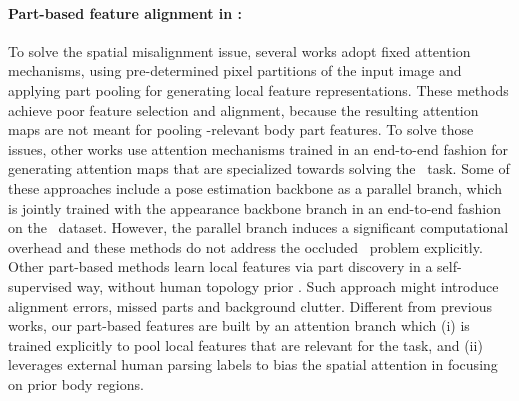 \documentclass[10pt,twocolumn,letterpaper]{article}
\begin{document}
\paragraph{Part-based feature alignment in {\reid}:}
To solve the spatial misalignment issue, several works \cite{PCB, DAReID, PGFA, Su2017, Zhao2017, Zheng2017, DSA-reID, HOReID, PGFA, SRNet, PVPM} adopt fixed attention mechanisms, using pre-determined pixel partitions of the input image and applying part pooling for generating local feature representations.
These methods achieve poor feature selection and alignment, because the resulting attention maps are not meant for pooling {\reid}-relevant body part features. 
To solve those issues, other works \cite{Suh2018, Zhu2020, ISP, PFD} use attention mechanisms trained in an end-to-end fashion for generating attention maps that are specialized towards solving the \reid\ task.
Some of these approaches \cite{Suh2018, Zhu2020, PFD} include a pose estimation backbone as a parallel branch, which is jointly trained with the appearance backbone branch in an end-to-end fashion on the \reid\ dataset. 
However, the parallel branch induces a significant computational overhead and these methods do not address the occluded \reid\ problem explicitly.
Other part-based methods learn local features via part discovery in a self-supervised way, without human topology prior \cite{ISP, PAT, DLPAR}.
Such approach might introduce alignment errors, missed parts and background clutter.
Different from previous works, our part-based features are built by an attention branch which (i) is trained explicitly to pool local features that are relevant for the {\reid} task, and (ii) leverages external human parsing labels to bias the spatial attention in focusing on prior body regions.








\vspace{-10pt}
\end{document}
